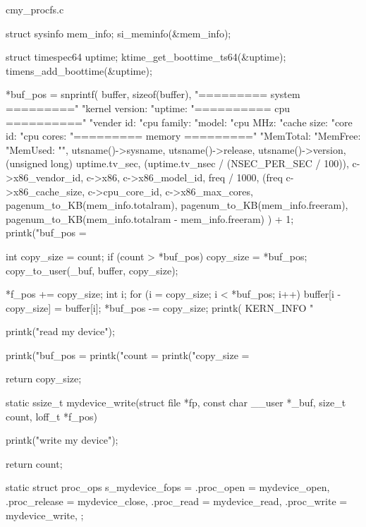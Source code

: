\begin{longlisting}
\begin{myminted}{c}{my\_procfs.c}
{{        struct sysinfo mem_info;
        si_meminfo(&mem_info);

        struct timespec64 uptime;
        ktime_get_boottime_ts64(&uptime);
        timens_add_boottime(&uptime);

        *buf_pos = snprintf(
            buffer, 
            sizeof(buffer), 
            "========= system =========\n"
            "kernel version: %
            "uptime: %
            "========== cpu ==========\n"
            "vender id: %
            "cpu family: %
            "model: %
            "cpu MHz: %
            "cache size: %
            "core id: %
            "cpu cores: %
            "========= memory =========\n"
            "MemTotal: %
            "MemFree: %
            "MemUsed: %
            "",
            utsname()->sysname,
            utsname()->release,
            utsname()->version,
            (unsigned long) uptime.tv_sec,
            (uptime.tv_nsec / (NSEC_PER_SEC / 100)),
            c->x86_vendor_id,
            c->x86,
            c->x86_model_id,
            freq / 1000, (freq %
            c->x86_cache_size,
            c->cpu_core_id,
            c->x86_max_cores,
            pagenum_to_KB(mem_info.totalram),
            pagenum_to_KB(mem_info.freeram),
            pagenum_to_KB(mem_info.totalram - mem_info.freeram)
        ) + 1;
        printk("buf_pos = %
    }

    int copy_size = count;
    if (count > *buf_pos) copy_size = *buf_pos;
    copy_to_user(_buf, buffer, copy_size);

    *f_pos += copy_size;
    int i;
    for (i = copy_size; i < *buf_pos; i++) {
        buffer[i - copy_size] = buffer[i];
    }
    *buf_pos -= copy_size;
    printk( KERN_INFO "%

    printk("read my device\n");

    printk("buf_pos = %
    printk("count = %
    printk("copy_size = %

    return copy_size;
}

static ssize_t mydevice_write(struct file *fp, const char __user *_buf, size_t count, loff_t *f_pos) {
    printk("write my device\n");

    return count;
}

static struct proc_ops s_mydevice_fops = {
    .proc_open    = mydevice_open,
    .proc_release = mydevice_close,
    .proc_read    = mydevice_read,
    .proc_write   = mydevice_write,
};


\end{myminted}
\end{longlisting}
